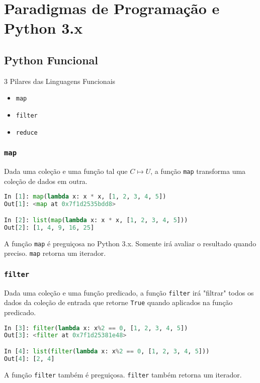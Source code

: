\documentclass[aspectratio=169]{beamer}
\begin{document}

\section{Paradigmas de Programação e Python 3.x}

\subsection{Python Funcional}

\begin{frame}{3 Pilares das Linguagens Funcionais}

    \begin{itemize}
        \item \texttt{map}
        \item \texttt{filter}
        \item \texttt{reduce}
    \end{itemize}

\end{frame}

\begin{frame}[fragile]
    \frametitle{\texttt{map}}
    Dada uma coleção e uma função tal que $C \mapsto U$, a função \texttt{map}
transforma uma coleção de dados em outra.
    \begin{lstlisting}[language=python]
In [1]: map(lambda x: x * x, [1, 2, 3, 4, 5])
Out[1]: <map at 0x7f1d2535bdd8>

In [2]: list(map(lambda x: x * x, [1, 2, 3, 4, 5]))
Out[2]: [1, 4, 9, 16, 25]
    \end{lstlisting}
    A função \texttt{map} é preguiçosa no Python 3.x. Somente irá avaliar o
resultado quando preciso. \texttt{map} retorna um iterador.
\end{frame}

\begin{frame}[fragile]
    \frametitle{\texttt{filter}}
    Dada uma coleção e uma função predicado, a função \texttt{filter} irá "filtrar"
todos os dados da coleção de entrada que retorne \texttt{True} quando aplicados na
função predicado.
    \begin{lstlisting}[language=python]
In [3]: filter(lambda x: x%2 == 0, [1, 2, 3, 4, 5])
Out[3]: <filter at 0x7f1d25381e48>

In [4]: list(filter(lambda x: x%2 == 0, [1, 2, 3, 4, 5]))
Out[4]: [2, 4]
    \end{lstlisting}
    A função \texttt{filter} também é preguiçosa. \texttt{filter} também retorna um
iterador.
\end{frame}
\end{document}
